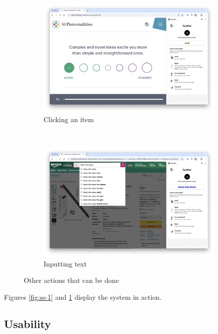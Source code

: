 \begin{figure}[ht]
    \centering
    \begin{subfigure}[ht]{0.48\textwidth}
        \centering
        \includegraphics[width=\textwidth]{images/screenshots/eyenav-click.png}
        \caption{Clicking an item}
    \end{subfigure}%
    ~ 
    \begin{subfigure}[ht]{0.48\textwidth}
        \centering
        \includegraphics[width=\textwidth]{images/screenshots/eyenav-input.png}
        \caption{Inputting text}
    \end{subfigure}
    \caption{Other actions that can be done}
    \label{figs:ss-2-3}

\end{figure}

Figures \ref{fig:ss-1} and \ref{figs:ss-2-3} display the system in action. 

\subsection{Usability}

